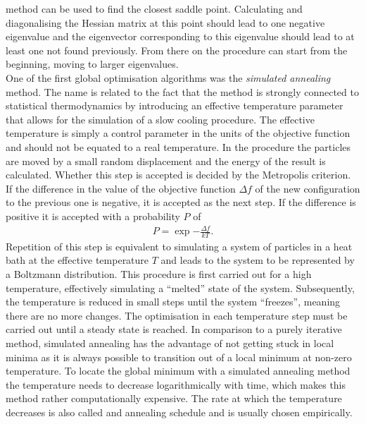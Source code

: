 method can be used to find the closest saddle point. Calculating and
diagonalising the Hessian matrix at this point should lead to one negative
eigenvalue and the eigenvector corresponding to this eigenvalue should lead to
at least one not found previously. From there on the procedure can start from
the beginning, moving to larger eigenvalues.
%
\\\newline
One of the first global optimisation algorithms was the \textit{simulated
annealing} method.\autocite{Kirkpatrick_OptimizationSimulatedAnnealing_1983} The
name is related to the fact that the method is strongly connected to statistical
thermodynamics by introducing an effective temperature parameter that allows for
the simulation of a slow cooling procedure. The effective temperature is simply
a control parameter in the units of the objective function and should not be
equated to a real temperature. In the procedure the particles are moved by a
small random displacement and the energy of the result is calculated. Whether
this step is accepted is decided by the Metropolis
criterion.\autocite{Metropolis_EquationStateCalculations_1953} If the difference
in the value of the objective function $\Delta f$ of the new configuration to
the previous one is negative, it is accepted as the next step. If the difference
is positive it is accepted with a probability $P$ of
%
\begin{align}
    P = \exp{-\frac{\Delta f}{kT}}.
\end{align}
%
Repetition of this step is equivalent to simulating a system of particles in a
heat bath at the effective temperature $T$ and leads to the system to be
represented by a Boltzmann distribution. This procedure is first carried out for
a high temperature, effectively simulating a ``melted'' state of the system.
Subsequently, the temperature is reduced in small steps until the system
``freezes'', meaning there are no more changes. The optimisation in each
temperature step must be carried out until a steady state is reached. In
comparison to a purely iterative method, simulated annealing has the advantage
of not getting stuck in local minima as it is always possible to transition out
of a local minimum at non-zero temperature. To locate the global minimum with a
simulated annealing method the temperature needs to decrease logarithmically
with time, which makes this method rather computationally expensive. The rate at
which the temperature decreases is also called and annealing schedule and is
usually chosen empirically.
%
\\\newline
